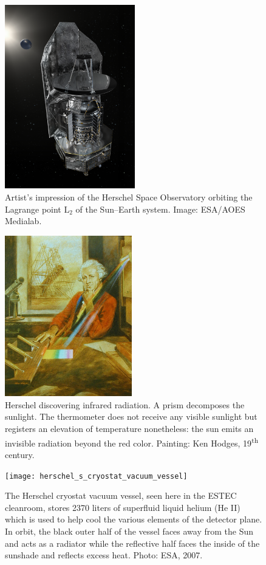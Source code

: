 \begin{figure}
    \centering
    \includegraphics[height=8cm]{herschel_spacecraft_artist}
    \caption{Artist's impression of the Herschel Space Observatory orbiting the Lagrange point $\text{L}_2$ of the Sun--Earth system.
    Image: ESA/AOES Medialab.}
    \label{fig:herschel_spacecraft_artist}
\end{figure}
\begin{figure}
    \centering
    \includegraphics[height=7cm]{herschel_discovers_infrared}
    \caption{Herschel discovering infrared radiation.
        A prism decomposes the sunlight.
        The thermometer does not receive any visible sunlight but registers an elevation of temperature nonetheless:
        the sun emits an invisible radiation beyond the red color.
        Painting: Ken Hodges, 19\textsuperscript{th} century.
    }
    \label{fig:herschel_discovers_infrared}
\end{figure}
\begin{figure}
    \centering
    \texttt{[image: herschel\_s\_cryostat\_vacuum\_vessel]}
    \caption{The Herschel cryostat vacuum vessel, seen here in the ESTEC cleanroom, stores 2370 liters of superfluid liquid helium (He II) which is used to help cool the various elements of the detector plane. In orbit, the black outer half of the vessel faces away from the Sun and acts as a radiator while the reflective half faces the inside of the sunshade and reflects excess heat.  Photo: ESA, 2007.}
    \label{fig:photo_hifi_cryo}
\end{figure}
